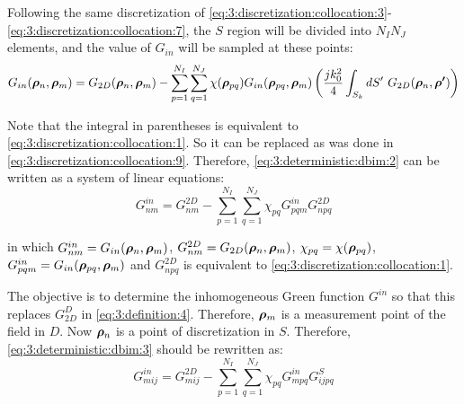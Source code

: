 			Following the same discretization of \eqref{eq:3:discretization:collocation:3}-\eqref{eq:3:discretization:collocation:7}, the $S$ region will be divided into $N_IN_J$ elements, and the value of $G_{in}$ will be sampled at these points:
			\begin{equation}
				G_{in}(\boldsymbol{\rho}_{n},\boldsymbol{\rho}_{m}) = G_{2D}(\boldsymbol{\rho}_{n},\boldsymbol{\rho}_{m}) - \sum\limits_{p=1}^{N_I}\sum\limits_{q=1}^{N_J} \chi(\boldsymbol{\rho}_{pq}) G_{in}(\boldsymbol{\rho}_{pq},\boldsymbol{\rho}_{m}) \left(\frac{jk_0^2}{4}\int_{S_k}dS^{\prime}~ G_{2D}(\boldsymbol{\rho}_n,\boldsymbol{\rho^\prime})\right) \label{eq:3:deterministic:dbim:2}
			\end{equation}
		
			Note that the integral in parentheses is equivalent to  \eqref{eq:3:discretization:collocation:1}. So it can be replaced as was done in \eqref{eq:3:discretization:collocation:9}. Therefore, \eqref{eq:3:deterministic:dbim:2} can be written as a system of linear equations:
			\begin{equation}
				G^{in}_{nm} = G^{2D}_{nm} - \sum\limits_{p=1}^{N_I}\sum\limits_{q=1}^{N_J} \chi_{pq}G^{in}_{pqm} G^{2D}_{npq} \label{eq:3:deterministic:dbim:3}
			\end{equation}
		
			\noindent in which $G^{in}_{nm} = G_{in}(\boldsymbol{\rho}_{n},\boldsymbol{\rho}_{m})$, $G^{2D}_{nm}=G_{2D}(\boldsymbol{\rho}_{n},\boldsymbol{\rho}_{m}) $, $\chi_{pq}=\chi(\boldsymbol{\rho}_{pq})$, $G^{in}_{pqm}=G_{in}(\boldsymbol{\rho}_{pq},\boldsymbol{\rho}_{m})$ and $G^{2D}_{npq}$ is equivalent to \eqref{eq:3:discretization:collocation:1}.
			
			The objective is to determine the inhomogeneous Green function $G^{in}$ so that this replaces $G^D_{2D}$ in \eqref{eq:3:definition:4}. Therefore, $\boldsymbol{\rho}_m$ is a measurement point of the field in $D$. Now $\boldsymbol{\rho}_n$ is a point of discretization in $S$. Therefore, \eqref{eq:3:deterministic:dbim:3} should be rewritten as:
			\begin{equation}
				G^{in}_{mij} = G^{2D}_{mij} - \sum\limits_{p=1}^{N_I}\sum\limits_{q=1}^{N_J} \chi_{pq}G^{in}_{mpq} G^{S}_{ijpq} \label{eq:3:deterministic:dbim:4}
			\end{equation}
		
